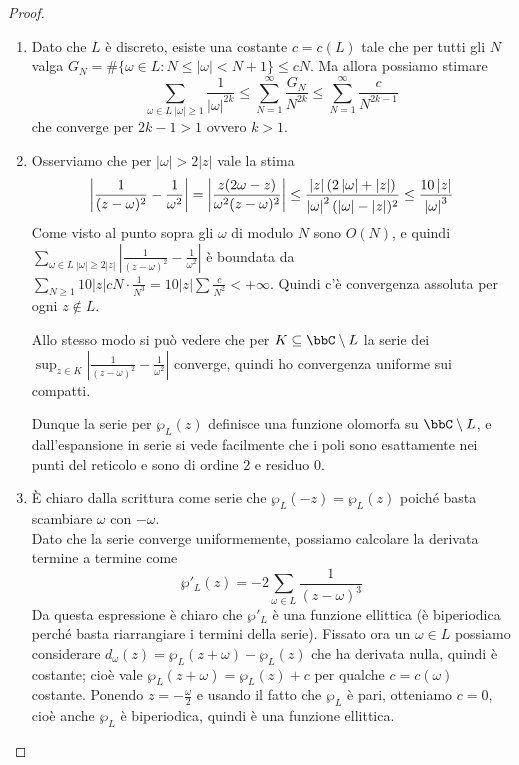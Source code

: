 \begin{proof}$ $
    \begin{enumerate}
        \item Dato che $L$ è discreto, esiste una costante $c=c(L)$ tale che per tutti gli $N$ valga $G_N=\#\{\omega\in L : N\le |\omega|<N+1\}\le cN$. Ma allora possiamo stimare $$\sum_{\omega\in L\ |\omega|\ge1}\dfrac1{|\omega|^{2k}}\le \sum_{N=1}^\infty \dfrac{G_N}{N^{2k}}\le \sum_{N=1}^\infty \dfrac{c}{N^{2k-1}}$$ che converge per $2k-1>1$ ovvero $k>1$.

        \item Osserviamo che per $|\omega|>2|z|$ vale la stima $$ \left|\frac{1}{(z-\omega)^2}-\frac{1}{\omega^2}\right| = \left|\frac{z(2\omega-z)}{\omega^2(z-\omega)^2}\right| \le \frac{\left| z \right|(2\left| \omega \right|+\left| z \right|)}{\left| \omega \right|^2(\left| \omega \right|-\left| z \right|)^2} \le \frac{10\left| z \right|}{\left| \omega \right|^3} $$
        Come visto al punto sopra gli $\omega$ di modulo $N$ sono $O(N)$, e quindi $\displaystyle\sum_{\omega\in L\ |\omega|\ge2|z|}\left|\frac{1}{(z-\omega)^2}-\frac{1}{\omega^2}\right|$ è boundata da $\sum_{N\ge1} 10|z|cN\cdot\frac{1}{N^3}=10|z|\sum\frac{c}{N^2}<+\infty$. Quindi c'è convergenza assoluta per ogni $z\not\in L$.

        Allo stesso modo si può vedere che per $K\subseteq\bbC\setminus L$ la serie dei  $\sup_{z\in K}\left|\frac{1}{(z-\omega)^2}-\frac{1}{\omega^2}\right|$ converge, quindi ho convergenza uniforme sui compatti.

        Dunque la serie per $\wp_L(z)$ definisce una funzione olomorfa su $\bbC\setminus L$, e dall'espansione in serie si vede facilmente che i poli sono esattamente nei punti del reticolo e sono di ordine $2$ e residuo $0$.

        \item È chiaro dalla scrittura come serie che $\wp_L(-z)=\wp_L(z)$ poiché basta scambiare $\omega$ con $-\omega$.\\
        Dato che la serie converge uniformemente, possiamo calcolare la derivata termine a termine come $$ \wp'_L(z)=-2\sum_{\omega\in L}\frac1{(z-\omega)^3} $$
        Da questa espressione è chiaro che $\wp'_L$ è una funzione ellittica (è biperiodica perché basta riarrangiare i termini della serie). Fissato ora un $\omega\in L$ possiamo considerare $d_\omega(z)=\wp_L(z+\omega)-\wp_L(z)$ che ha derivata nulla, quindi è costante; cioè vale $\wp_L(z+\omega)=\wp_L(z)+c$ per qualche $c=c(\omega)$ costante. Ponendo $z=-\frac\omega2$ e usando il fatto che $\wp_L$ è pari, otteniamo $c=0$, cioè anche $\wp_L$ è biperiodica, quindi è una funzione ellittica.
    \end{enumerate}
\end{proof}

